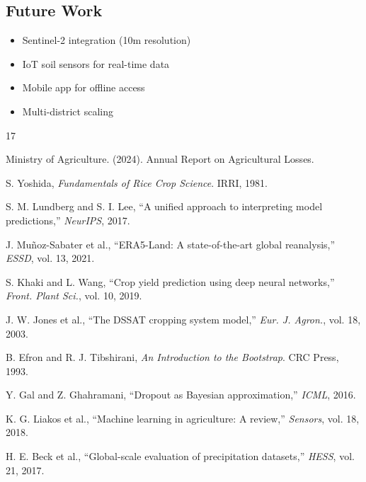 \documentclass[journal,10pt,twoside]{IEEEtran}
\begin{document}
\subsection{Future Work}
\begin{itemize}
    \item Sentinel-2 integration (10m resolution)
    \item IoT soil sensors for real-time data
    \item Mobile app for offline access
    \item Multi-district scaling
\end{itemize}


\begin{thebibliography}{17}

Ministry of Agriculture. (2024). Annual Report on Agricultural Losses.

S. Yoshida, \textit{Fundamentals of Rice Crop Science}. IRRI, 1981.

S. M. Lundberg and S. I. Lee, ``A unified approach to interpreting model predictions,'' \textit{NeurIPS}, 2017.

J. Muñoz-Sabater et al., ``ERA5-Land: A state-of-the-art global reanalysis,'' \textit{ESSD}, vol. 13, 2021.

S. Khaki and L. Wang, ``Crop yield prediction using deep neural networks,'' \textit{Front. Plant Sci.}, vol. 10, 2019.

J. W. Jones et al., ``The DSSAT cropping system model,'' \textit{Eur. J. Agron.}, vol. 18, 2003.

B. Efron and R. J. Tibshirani, \textit{An Introduction to the Bootstrap}. CRC Press, 1993.

Y. Gal and Z. Ghahramani, ``Dropout as Bayesian approximation,'' \textit{ICML}, 2016.

K. G. Liakos et al., ``Machine learning in agriculture: A review,'' \textit{Sensors}, vol. 18, 2018.

H. E. Beck et al., ``Global-scale evaluation of precipitation datasets,'' \textit{HESS}, vol. 21, 2017.

\end{thebibliography}
\end{document}
